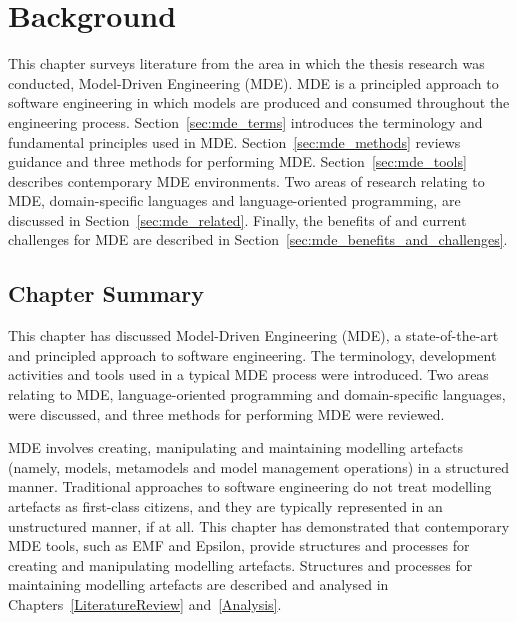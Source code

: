 
\chapter{Background}
\label{Background}
This chapter surveys literature from the area in which the thesis research was conducted, Model-Driven Engineering (MDE). MDE is a principled approach to software engineering in which models are produced and consumed throughout the engineering process. Section~\ref{sec:mde_terms} introduces the terminology and fundamental principles used in MDE. Section~\ref{sec:mde_methods} reviews guidance and three methods for performing MDE. Section~\ref{sec:mde_tools} describes contemporary MDE environments. Two areas of research relating to MDE, domain-specific languages and language-oriented programming, are discussed in Section~\ref{sec:mde_related}. Finally, the benefits of and current challenges for MDE are described in Section~\ref{sec:mde_benefits_and_challenges}.







\section{Chapter Summary}
This chapter has discussed Model-Driven Engineering (MDE), a state-of-the-art and principled approach to software engineering. The terminology, development activities and tools used in a typical MDE process were introduced. Two areas relating to MDE, language-oriented programming and domain-specific languages, were discussed, and three methods for performing MDE were reviewed.

MDE involves creating, manipulating and maintaining modelling artefacts (namely, models, metamodels and model management operations) in a structured manner. Traditional approaches to software engineering do not treat modelling artefacts as first-class citizens, and they are typically represented in an unstructured manner, if at all. This chapter has demonstrated that contemporary MDE tools, such as EMF and Epsilon, provide structures and processes for creating and manipulating modelling artefacts. Structures and processes for maintaining modelling artefacts are described and analysed in Chapters~\ref{LiteratureReview} and~\ref{Analysis}.